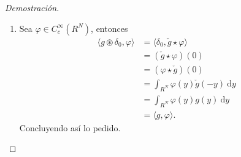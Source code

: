 \documentclass[10pt,a4paper]{report}
\newcommand{\abs}[2][y]{\if#1y\left\fi\lvert#2\if#1y\right\fi\rvert}
\newcommand{\norm}[2][y]{{\if#1y\left\fi\lVert#2\if#1y\right\fi\rVert}}
\theoremstyle{definition}
\renewcommand{\theproblem}{\Alph{problem}}
\numberwithin{equation}{problem}
\providecommand{\abs}[1]{\left\lvert#1\right\rvert}
\providecommand{\norm}[1]{\left\lVert#1\right\rVert}
\begin{document}
\begin{proof}[\textcolor{rojo}{Demostración}]
\begin{enumerate}[label=\textbf{\theproblem.\arabic{*}.},ref=\theproblem.\arabic{*},parsep=1ex]
\begin{align*}
           	&= \langle u\star g,\varphi \rangle 
           \end{align*}
           El Teorema de Fubini es válido, ya que para un compacto $K$ tal que $\text{supp}(\varphi\star\check{g})\subset K$, se tiene
           \begin{align*}
           	\int_{R^{N}}\int_{R^{N}}\abs{u(x)\varphi(y)g(y-x)}\ \text{d}y\text{d}x &= \int_{R^{N}}\abs{u(x)(\varphi\star\check{g})(x)}\ \text{d}x\\ &= \int_{K}\abs{u(x)(\varphi\star\check{g})(x)}\ \text{d}x\\ &\leq \norm{u}_{L^{1}(K)}\norm{\varphi\star\check{g}}_{L^{\infty}(K)}\\&= \norm{u}_{L^{1}(K)}\norm{\varphi\star\check{g}}_{L^{\infty}(R^{N})}\\
           	&\leq \norm{u}_{L^{1}(K)} \norm{\varphi}_{L^{1}(R^{N})}\norm{\check{g}}_{L^{\infty}(R^{N})} < +\infty.
           \end{align*}
           \item Sea $\varphi\in C_{c}^{\infty}(R^{N})$, entonces
           \begin{align*}
           	\langle g\circledast \delta_0,\varphi \rangle &= \langle \delta_0, \check{g}\star \varphi \rangle\\
           	&= \left(\check{g}\star \varphi\right)(0)\\
           	&= \left(\varphi\star\check{g}\right)(0)\\
           	&= \int_{R^{N}} \varphi(y)\check{g}\left(-y\right)\ \text{d}y\\
           	&= \int_{R^{N}} \varphi(y)g\left(y\right)\ \text{d}y\\
           	&= \langle g,\varphi \rangle.
           \end{align*}
           Concluyendo así lo pedido.
    	\end{enumerate}
    \end{proof}
    \bigskip
    \newpage
\end{document}

